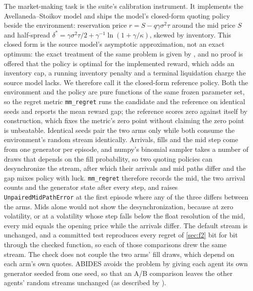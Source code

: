 The market-making task is the suite's calibration instrument. It implements the Avellaneda--Stoikov model \citep{avellaneda2008high} and ships the model's closed-form quoting policy beside the environment: reservation price $r = S - q\gamma\sigma^2\tau$ around the mid price $S$ and half-spread $\delta^* = \gamma\sigma^2\tau/2 + \gamma^{-1}\ln(1+\gamma/\kappa)$, skewed by inventory. This closed form is the source model's asymptotic approximation, not an exact optimum: the exact treatment of the same problem is given by \citet{gueant2013dealing}, and no proof is offered that the policy is optimal for the implemented reward, which adds an inventory cap, a running inventory penalty and a terminal liquidation charge the source model lacks. We therefore call it the closed-form reference policy. Both the environment and the policy are pure functions of the same frozen parameter set, so the regret metric \texttt{mm\_regret} runs the candidate and the reference on identical seeds and reports the mean reward gap; the reference scores zero against itself by construction, which fixes the metric's zero point without claiming the zero point is unbeatable. Identical seeds pair the two arms only while both consume the environment's random stream identically. Arrivals, fills and the mid step come from one generator per episode, and numpy's binomial sampler takes a number of draws that depends on the fill probability, so two quoting policies can desynchronize the stream, after which their arrivals and mid paths differ and the gap mixes policy with luck. \texttt{mm\_regret} therefore records the mid, the two arrival counts and the generator state after every step, and raises \texttt{UnpairedMidPathError} at the first episode where any of the three differs between the arms. Mids alone would not show the desynchronization, because at zero volatility, or at a volatility whose step falls below the float resolution of the mid, every mid equals the opening price while the arrivals differ. The default stream is unchanged, and a committed test reproduces every regret of \cref{sec:f2} bit for bit through the checked function, so each of those comparisons drew the same stream. The check does not couple the two arms' fill draws, which depend on each arm's own quotes. ABIDES avoids the problem by giving each agent its own generator seeded from one seed, so that an A/B comparison leaves the other agents' random streams unchanged (as described by \citealp[PDF p.~41]{fernandezvicente2025market}).

